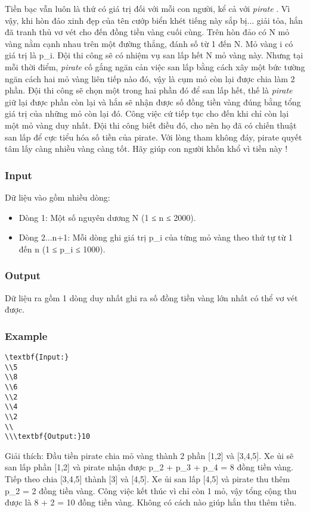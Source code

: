 



   Tiền bạc vẫn luôn là thứ có giá trị đối với mỗi con người, kể cả với   \emph{    pirate   }   . Vì vậy, khi hòn đảo xinh đẹp của tên cướp biển khét tiếng này sắp bị... giải tỏa, hắn đã tranh thủ vơ vét cho đến đồng tiền vàng cuối cùng. Trên hòn đảo có N mỏ vàng nằm cạnh nhau trên một đường thẳng, đánh số từ 1 đến N. Mỏ vàng i có giá trị là p\_i. Đội thi công sẽ có nhiệm vụ san lấp hết N mỏ vàng này. Nhưng tại mỗi thời điểm,   \emph{    pirate   }   cố gắng ngăn cản việc san lấp bằng cách xây một bức tường ngăn cách hai mỏ vàng liên tiếp nào đó, vậy là cụm mỏ còn lại được chia làm 2 phần. Đội thi công sẽ chọn một trong hai phần đó để san lấp hết, thế là   \emph{    pirate   }   giữ lại được phần còn lại và hắn sẽ nhận được số đồng tiền vàng đúng bằng tổng giá trị của những mỏ còn lại đó. Công việc cứ tiếp tục cho đến khi chỉ còn lại một mỏ vàng duy nhất. Đội thi công biết điều đó, cho nên họ đã có chiến thuật san lấp để cực tiểu hóa số tiền của pirate. Với lòng tham không đáy, pirate quyết tâm lấy càng nhiều vàng càng tốt. Hãy giúp con người khốn khổ vì tiền này !  

\subsubsection{   Input  }

   Dữ liệu vào gồm nhiều dòng:  
\begin{itemize}
	\item     Dòng 1: Một số nguyên dương N (1 ≤ n ≤ 2000).   
	\item     Dòng 2...n+1: Mỗi dòng ghi giá trị p\_i của từng mỏ vàng theo thứ tự từ 1 đến n (1 ≤ p\_i ≤ 1000).   
\end{itemize}

\subsubsection{   Output  }

   Dữ liệu ra gồm 1 dòng duy nhất ghi ra số đồng tiền vàng lớn nhất có thể vơ vét được.  

\subsubsection{   Example  }
\begin{verbatim}
\textbf{Input:}
\\5
\\8
\\6
\\2
\\4
\\2
\\
\\\textbf{Output:}10
\end{verbatim}

   Giải thích: Đầu tiền pirate chia mỏ vàng thành 2 phần [1,2] và [3,4,5]. Xe ủi sẽ san lấp phần [1,2] và pirate nhận được p\_2 + p\_3 + p\_4 =  8 đồng tiền vàng. Tiếp theo chia [3,4,5] thành [3] và [4,5]. Xe ủi san lấp [4,5] và pirate thu thêm p\_2 = 2 đồng tiền vàng. Công việc kết thúc vì chỉ còn 1 mỏ, vậy tổng cộng thu được là 8 + 2 = 10 đồng tiền vàng. Không có cách nào giúp hắn thu thêm tiền.  